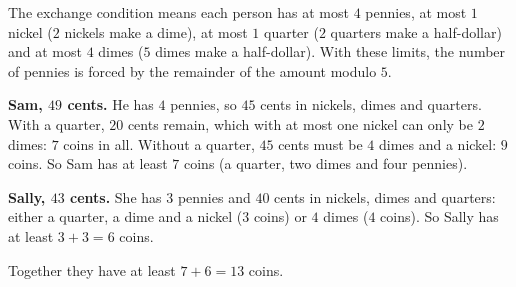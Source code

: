 The exchange condition means each person has at most $4$ pennies, at most $1$ nickel ($2$ nickels make a dime), at most $1$ quarter ($2$ quarters make a half-dollar) and at most $4$ dimes ($5$ dimes make a half-dollar). With these limits, the number of pennies is forced by the remainder of the amount modulo $5$.

\textbf{Sam, $49$ cents.} He has $4$ pennies, so $45$ cents in nickels, dimes and quarters. With a quarter, $20$ cents remain, which with at most one nickel can only be $2$ dimes: $7$ coins in all. Without a quarter, $45$ cents must be $4$ dimes and a nickel: $9$ coins. So Sam has at least $7$ coins (a quarter, two dimes and four pennies).

\textbf{Sally, $43$ cents.} She has $3$ pennies and $40$ cents in nickels, dimes and quarters: either a quarter, a dime and a nickel ($3$ coins) or $4$ dimes ($4$ coins). So Sally has at least $3+3=6$ coins.

Together they have at least $7+6=\boxed{13}$ coins.
